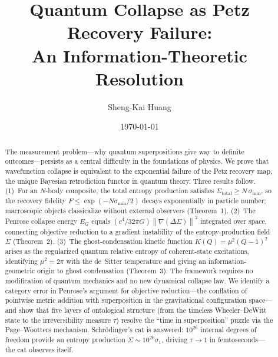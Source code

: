 \documentclass[prl,twocolumn,superscriptaddress,longbibliography,floatfix]{revtex4-2}
\newcommand{\norm}[1]{\left\|#1\right\|}
\newcommand{\tauasym}{\tau}
\begin{document}
\title{Quantum Collapse as Petz Recovery Failure:\\
An Information-Theoretic Resolution}

\author{Sheng-Kai Huang}

\date{\today}

\begin{abstract}
The measurement problem---why quantum superpositions give way to
definite outcomes---persists as a central difficulty in the
foundations of physics.  We prove that wavefunction collapse is
equivalent to the exponential failure of the Petz recovery map, the
unique Bayesian retrodiction functor in quantum theory.  Three results
follow.  (1)~For an $N$-body composite, the total entropy production
satisfies $\Sigma_{\mathrm{total}} \geq N\,\sigma_{\min}$, so the
recovery fidelity $F \leq \exp(-N\sigma_{\min}/2)$ decays
exponentially in particle number; macroscopic objects classicalize
without external observers (Theorem~1).
(2)~The Penrose collapse energy $E_G$ equals
$(c^4/32\pi G)\norm{\nabla(\Delta\Sigma)}^2$ integrated over
space, connecting objective reduction to a gradient instability
of the entropy-production field~$\Sigma$ (Theorem~2).
(3)~The ghost-condensation kinetic function
$K(Q) = \mu^2(Q-1)^2$ arises as the regularized quantum relative
entropy of coherent-state excitations, identifying
$\mu^2 = 2\pi$ with the de~Sitter temperature and giving an
information-geometric origin to ghost condensation (Theorem~3).
The framework requires no modification of quantum mechanics and no
new dynamical collapse law.  We identify a category error in
Penrose's argument for objective reduction---the conflation of
pointwise metric addition with superposition in the gravitational
configuration space---and show that five layers of ontological
structure (from the timeless Wheeler--DeWitt state to the
irreversibility measure $\tauasym$) resolve the ``time in
superposition'' puzzle via the Page--Wootters mechanism.
Schr\"{o}dinger's cat is answered: $10^{26}$ internal degrees of
freedom provide an entropy production $\Sigma \sim 10^{26}\sigma_1$,
driving $\tauasym \to 1$ in femtoseconds---the cat observes itself.
\end{abstract}

\maketitle

\end{document}
